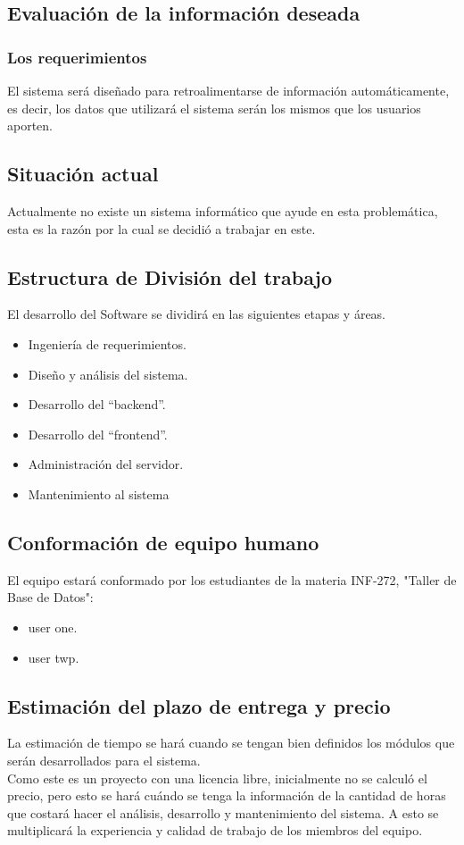 \documentclass[letterpaper]{article}
\begin{document}
\subsection{Evaluación de la información deseada }
\subsubsection*{Los requerimientos}
El sistema será diseñado para retroalimentarse de información
automáticamente, es decir, los datos que utilizará el sistema serán los mismos
que los usuarios aporten.
\subsection{Situación actual}
Actualmente no existe un sistema informático que ayude en esta
problemática, esta es la razón por la cual se decidió a trabajar en este.
\subsection{Estructura de División del trabajo}
El desarrollo del Software se dividirá en las siguientes etapas y áreas.
\begin{itemize}
\item Ingeniería de requerimientos.
\item Diseño y análisis del sistema.
\item Desarrollo del “backend”.
\item Desarrollo del “frontend”.
\item Administración del servidor.
\item Mantenimiento al sistema
\end{itemize}
\subsection{Conformación de equipo humano}
El equipo estará conformado por los estudiantes de la materia INF-272, "Taller de Base de Datos":
\begin{itemize}
\item user one.
\item user twp.
\end{itemize}
\subsection{Estimación del plazo de entrega y precio}
La estimación de tiempo se hará cuando se tengan bien definidos los
módulos que serán desarrollados para el sistema.
\\
Como este es un proyecto con una licencia libre, inicialmente no se
calculó el precio, pero esto se hará cuándo se tenga la información de la cantidad de horas que costará hacer el análisis, desarrollo y mantenimiento del sistema. A esto se multiplicará la experiencia y calidad de trabajo de los miembros del equipo.
\end{document}
